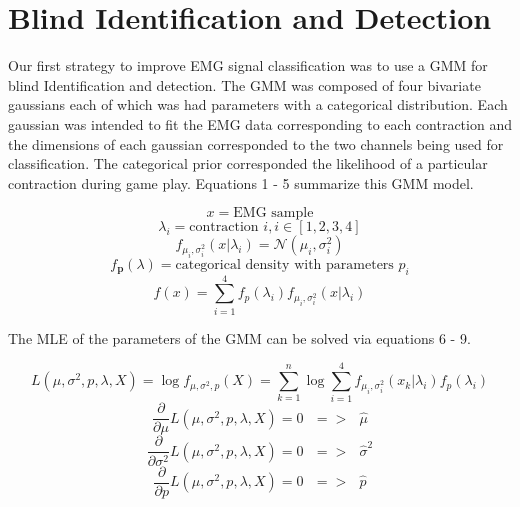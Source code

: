 \documentclass[times, 10pt,twocolumn]{article}
\begin{document}
\section{Blind Identification and Detection}
Our first strategy to improve EMG signal classification was to use a GMM for blind Identification and detection.
The GMM was composed of four bivariate gaussians each of which was had parameters with a categorical distribution.
Each gaussian was intended to fit the EMG data corresponding to each contraction and the dimensions of each
gaussian corresponded to the two channels being used for classification. The categorical prior corresponded the
likelihood of a particular contraction during game play. Equations 1 - 5 summarize this GMM model.

\begin{equation}
x = \text{EMG sample}
\end{equation}
\begin{equation}
\lambda_i = \text{contraction }i, i\in[1,2,3,4]
\end{equation}
\begin{equation}
f_{\mu_i,\sigma_i^2}(x|\lambda_i) = \mathcal{N}(\mu_i,\sigma_i^2)
\end{equation}
\begin{equation}
f_{\mathbf{p}}(\lambda) = \text{categorical density with parameters } p_i
\end{equation}
\begin{equation}
f(x) = \sum_{i=1}^{4}f_{p}(\lambda_i)f_{\mu_i,\sigma_i^2}(x|\lambda_i)
\end{equation}

The MLE of the parameters of the GMM can be solved via equations 6 - 9.

\begin{equation}
L(\mu,\sigma^2, p, \lambda, X) = \log{f_{\mu,\sigma^2,p}(X)} = \sum_{k=1}^{n}\log{\sum_{i=1}^{4}f_{\mu_i,\sigma_i^2}(x_k|\lambda_i)f_{p}(\lambda_i)}
\end{equation}
\begin{equation}
\frac{\partial}{\partial{\mu}}L(\mu,\sigma^2,p, \lambda,X) = 0 \text{ } => \text{ } \hat{\mu}
\end{equation}
\begin{equation}
\frac{\partial}{\partial{\sigma^2}}L(\mu,\sigma^2,p,\lambda,X) = 0 \text{ } => \text{ } \hat{\sigma}^2
\end{equation}
\begin{equation}
\frac{\partial}{\partial{p}}L(\mu,\sigma^2,p,\lambda,X) = 0 \text{ } => \text{ } \hat{p}
\end{equation}
\end{document}
